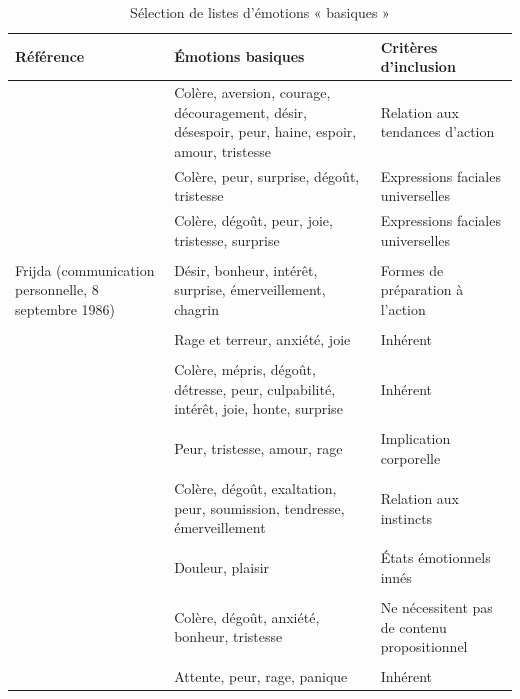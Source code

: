 \documentclass[a4paper,12pt]{report}
\begin{document}
\begin{table}[!ht]
    \centering

    \caption{Sélection de listes d'émotions « basiques »}
    \label{tab:basiques}    
    \begin{tabular}{p{4cm} p{7cm} p{4.3cm}}
        \hline
        \textbf{Référence} & \textbf{Émotions basiques} & \textbf{Critères d'inclusion} \\
        \hline
	    \textcite{arnold60} & \raggedright Colère, aversion, courage, découragement, désir, désespoir, peur, haine, espoir, amour, tristesse & \raggedright Relation aux tendances d'action \tabularnewline
        \textcite{darwin1872} & Colère, peur, surprise, dégoût, tristesse & Expressions faciales universelles \\
       \raggedright \textcite{ekman82} & \raggedright Colère, dégoût, peur, joie, tristesse, surprise & \raggedright Expressions faciales universelles \tabularnewline
        &&\\
      \raggedright  Frijda (communication personnelle, 8 septembre 1986) & \raggedright Désir, bonheur, intérêt, surprise, émerveillement, chagrin & \raggedright Formes de préparation à l'action \tabularnewline
        &&\\
        \raggedright \textcite{gray84} & \raggedright Rage et terreur, anxiété, joie & \raggedright Inhérent \tabularnewline
        &&\\
        \raggedright \textcite{izard71} & \raggedright Colère, mépris, dégoût, détresse, peur, culpabilité, intérêt, joie, honte, surprise & \raggedright Inhérent \tabularnewline
        &&\\
        \raggedright \textcite{james1884} & \raggedright Peur, tristesse, amour, rage & \raggedright Implication corporelle \tabularnewline
        &&\\
        \raggedright \textcite{mcdougall26} & \raggedright Colère, dégoût, exaltation, peur, soumission, tendresse, émerveillement & \raggedright Relation aux instincts \tabularnewline
        &&\\
       \raggedright \textcite{mowrer60} & \raggedright Douleur, plaisir & \raggedright États émotionnels innés \tabularnewline
        &&\\
        \raggedright \textcite{oatley87} & \raggedright Colère, dégoût, anxiété, bonheur, tristesse & \raggedright Ne nécessitent pas de contenu propositionnel \tabularnewline
        &&\\
        \raggedright \textcite{panksepp82} & \raggedright Attente, peur, rage, panique & \raggedright Inhérent \tabularnewline

\end{tabular}
\end{table}
\end{document}
